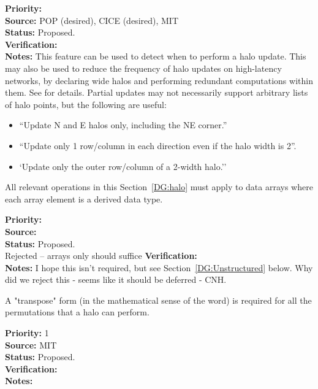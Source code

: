 \begin{reqlist}
{\bf Priority:} \\
{\bf Source:} POP (desired), CICE (desired), MIT \\
{\bf Status:} Proposed. \\
{\bf Verification:} \\
{\bf Notes:} This feature can be used to detect when to perform a halo
  update. This may also be used to reduce the frequency of halo
  updates on high-latency networks, by declaring wide halos and
  performing redundant computations within them. See \cite{ref:b2001}
  for details. Partial updates may not necessarily support
  arbitrary lists of halo points, but the following are useful:
  \begin{itemize}
  \item ``Update N and E halos only, including the NE corner.''
  \item ``Update only 1 row/column in each direction even if the halo
    width is 2''.
  \item `Update only the outer row/column of a 2-width halo.''
  \end{itemize}
\end{reqlist}


All relevant operations in this Section~\ref{DG:halo} must apply to
data arrays where each array element is a derived data type.

\begin{reqlist}
{\bf Priority:} \\
{\bf Source:} \\
{\bf Status:} Proposed. \\ Rejected -- arrays only should suffice
{\bf Verification:} \\
{\bf Notes:} I hope this isn't required, but see
  Section~\ref{DG:Unstructured} below.
  Why did we reject this - seems like it should be deferred - CNH.
\end{reqlist}

A "transpose" form (in the mathematical sense of the word) is required
for all the permutations that a halo can perform.
\begin{reqlist}
{\bf Priority:} 1 \\ 
{\bf Source:}  MIT \\
{\bf Status:} Proposed. \\
{\bf Verification:} \\
{\bf Notes:}
\end{reqlist}

